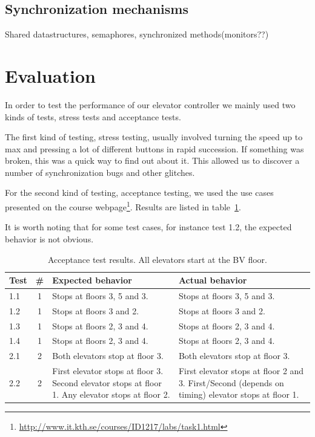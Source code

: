 \documentclass[a4paper]{article}
\begin{document}
\subsection{Synchronization mechanisms}
Shared datastructures, semaphores, synchronized methods(monitors??) 


\section{Evaluation}

In order to test the performance of our elevator controller we mainly used two
kinds of tests, stress tests and acceptance tests.

The first kind of testing, stress testing, usually involved turning the speed up
to max and pressing a lot of different buttons in rapid succession. If something
was broken, this was a quick way to find out about it. This allowed us to
discover a number of synchronization bugs and other glitches.

For the second kind of testing, acceptance testing, we used the use cases
presented on the course
webpage\footnote{\url{http://www.it.kth.se/courses/ID1217/labs/task1.html}}.
Results are listed in table~\ref{tab:acceptance_test_results}.

It is worth noting that for some test cases, for instance test 1.2, the expected
behavior is not obvious.

\begin{table}[h]
    \begin{tabular}{| l | c | p{4.7cm} | p{4.7cm} |}
        \hline
        Test & \# & Expected behavior & Actual behavior \\
        \hline
        1.1 & 1 &
            Stops at floors 3, 5 and 3. &
            Stops at floors 3, 5 and 3. \\
        1.2 & 1 &
            Stops at floors 3 and 2. &
            Stops at floors 3 and 2. \\
        1.3 & 1 &
            Stops at floors 2, 3 and 4. &
            Stops at floors 2, 3 and 4. \\
        1.4 & 1 &
            Stops at floors 2, 3 and 4. &
            Stops at floors 2, 3 and 4. \\
        2.1 & 2 &
            Both elevators stop at floor 3. &
            Both elevators stop at floor 3. \\
        2.2 & 2 &
            First elevator stops at floor 3.
                Second elevator stops at floor 1.
                Any elevator stops at floor 2. &
            First elevator stops at floor 2 and 3.
            First/Second (depends on timing) elevator stops at floor 1. \\
        \hline
    \end{tabular}
    \caption{Acceptance test results. All elevators start at the BV floor.}
    \label{tab:acceptance_test_results}
\end{table}
\end{document}
